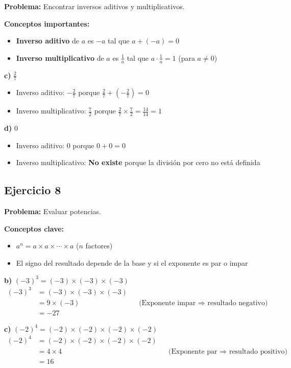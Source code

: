 \textbf{Problema:} Encontrar inversos aditivos y multiplicativos.

\textbf{Conceptos importantes:}
\begin{itemize}
    \item \textbf{Inverso aditivo} de $a$ es $-a$ tal que $a + (-a) = 0$
    \item \textbf{Inverso multiplicativo} de $a$ es $\frac{1}{a}$ tal que $a \cdot \frac{1}{a} = 1$ (para $a \neq 0$)
\end{itemize}

\textbf{c)} $\frac{2}{7}$
\begin{itemize}
    \item Inverso aditivo: $-\frac{2}{7}$ porque $\frac{2}{7} + \left(-\frac{2}{7}\right) = 0$
    \item Inverso multiplicativo: $\frac{7}{2}$ porque $\frac{2}{7} \times \frac{7}{2} = \frac{14}{14} = 1$
\end{itemize}

\textbf{d)} $0$
\begin{itemize}
    \item Inverso aditivo: $0$ porque $0 + 0 = 0$
    \item Inverso multiplicativo: \textbf{No existe} porque la división por cero no está definida
\end{itemize}

\subsection*{Ejercicio 8}

\textbf{Problema:} Evaluar potencias.

\textbf{Conceptos clave:}
\begin{itemize}
    \item $a^n = a \times a \times \cdots \times a$ ($n$ factores)
    \item El signo del resultado depende de la base y si el exponente es par o impar
\end{itemize}

\textbf{b)} $(-3)^3 = (-3) \times (-3) \times (-3)$
\begin{align}
(-3)^3 &= (-3) \times (-3) \times (-3)\\
&= 9 \times (-3) && \text{(Exponente impar $\Rightarrow$ resultado negativo)}\\
&= -27
\end{align}

\textbf{c)} $(-2)^4 = (-2) \times (-2) \times (-2) \times (-2)$
\begin{align}
(-2)^4 &= (-2) \times (-2) \times (-2) \times (-2)\\
&= 4 \times 4 && \text{(Exponente par $\Rightarrow$ resultado positivo)}\\
&= 16
\end{align}

